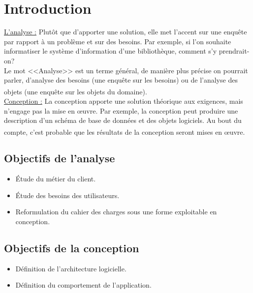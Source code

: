 \documentclass[12pt]{report}
\begin{document}
\newpage

\section{Introduction}
\vspace{0.2in}
\uline{L'analyse :} Plutôt que d’apporter une solution, elle met l’accent sur une enquête par rapport à un problème et sur des besoins. Par exemple, si l’on souhaite informatiser le système d’information d’une bibliothèque, comment s’y prendrait-on?
\\
Le mot <<Analyse>> est un terme général, de manière plus précise on pourrait parler, d’analyse des besoins (une enquête sur les besoins) ou de l’analyse des objets (une enquête sur les objets du domaine).\textsuperscript{\cite{UIS}\cite{booch2005unified}}
\\
\uline{Conception :} La conception apporte une solution théorique aux exigences, mais n’engage pas la mise en œuvre. Par exemple, la conception peut produire une description d’un schéma de base de données et des objets logiciels. Au bout du compte, c’est probable que les résultats de la conception seront mises en œuvre.\textsuperscript{\cite{UIS}\cite{booch2005unified}}

\vspace{-0.1in}

\subsection{Objectifs de l’analyse}
\begin{itemize}
    \item Étude du m\'etier du client.
    \item Étude des besoins des utilisateurs.
    \item Reformulation du cahier des charges sous une forme exploitable en conception.
\end{itemize}

\vspace{-0.15in}

\subsection{Objectifs de la conception}
\begin{itemize}
    \item D\'efinition de l’architecture logicielle.
    \item D\'efinition du comportement de l’application.
\end{itemize}
\end{document}
